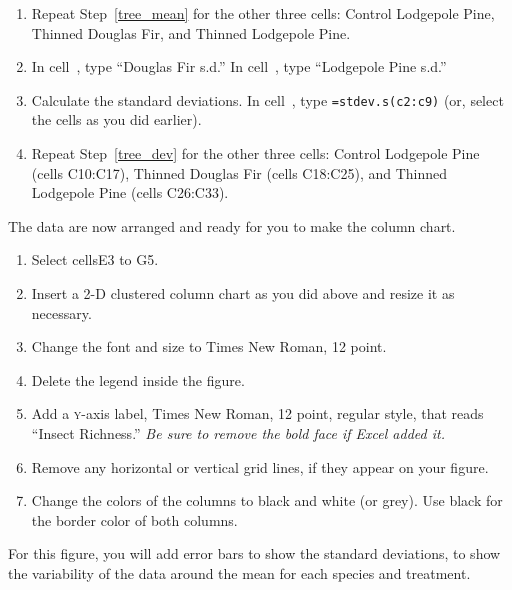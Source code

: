 \documentclass[12pt, hidelinks]{exam}
\newcommand*\xcell[1]{cell~\liningnum{#1}}
\newcommand*\axis[1]{{\scshape #1}-axis}
\begin{document}
\begin{questions}
\begin{enumerate}
	\item Repeat Step~\ref{tree_mean} for the other three cells: Control Lodgepole Pine, Thinned Douglas Fir, and Thinned Lodgepole Pine. 

	\item \label{tree_dev} In \xcell{I3}, type ``Douglas Fir s.d.'' In \xcell{J3}, type ``Lodgepole Pine s.d.''

	\item Calculate the standard deviations. In \xcell{I4}, type \texttt{=stdev.s(c2:c9)} (or, select the cells as you did earlier).

	\item Repeat Step~\ref{tree_dev} for the other three cells: Control Lodgepole Pine (cells {\liningnum C10:C17}), Thinned Douglas Fir (cells {\liningnum C18:C25}), and Thinned Lodgepole Pine (cells {\liningnum C26:C33}). 

\end{enumerate}

The data are now arranged and ready for you to make the column chart.

\begin{enumerate}[resume]
	\item Select cells{\liningnum E3 to G5}.
	
	\item Insert a 2-D clustered column chart as you did above and resize it as necessary.
	
	\item Change the font and size to Times New Roman, 12 point.
	
	\item Delete the legend inside the figure.
	
	\item Add a \axis{y} label, Times New Roman, 12 point, regular style, that reads “Insect Richness.” \emph{Be sure to remove the bold face if Excel added it.}
	
	\item Remove any horizontal or vertical grid lines, if they appear on your figure.
	
	\item Change the colors of the columns to black and white (or grey). Use black for the border color of both columns.
	
\end{enumerate}

For this figure, you will add error bars to show the standard deviations, to show the variability of the data around the mean for each species and treatment.



\end{questions}
\end{document}

